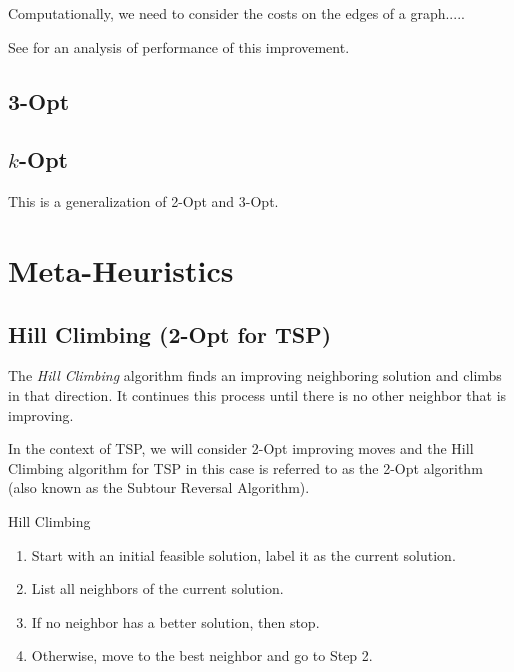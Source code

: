 
Computationally, we need to consider the costs on the edges of a graph.....


See 
\cite{Englert2014} for an analysis of performance of this improvement.
\subsection{3-Opt}


\subsection{$k$-Opt}
This is a generalization of 2-Opt and 3-Opt.

\section{Meta-Heuristics}

\subsection{Hill Climbing (2-Opt for TSP)}
The \emph{Hill Climbing} algorithm finds an improving neighboring solution and climbs in that direction.  It continues this process until there is no other neighbor that is improving.  

In the context of TSP, we will consider 2-Opt improving moves and the Hill Climbing algorithm for TSP in this case is referred to as the 2-Opt algorithm (also known as the Subtour Reversal Algorithm).
\begin{general}{Hill Climbing}{}
\begin{enumerate}
\item Start with an initial feasible solution, label it as the current solution.
\item List all neighbors of the current solution.
\item If no neighbor has a better solution, then stop.
\item Otherwise, move to the best neighbor and go to Step 2.
\end{enumerate}
\end{general}



